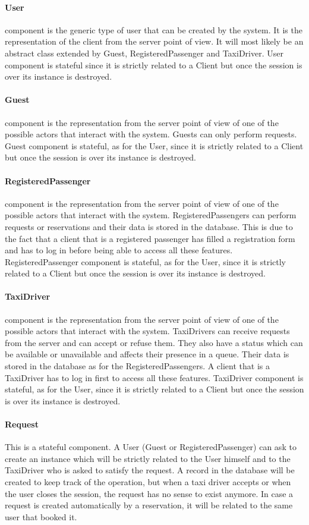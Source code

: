 		\paragraph{User} component is the generic type of user that can be created by the system. It is the representation of the client from the server point of view. It will most likely be an abstract class extended by Guest, RegisteredPassenger and TaxiDriver. User component is stateful since it is strictly related to a Client but once the session is over its instance is destroyed.
		\paragraph{Guest} component is the representation from the server point of view of one of the possible actors that interact with the system. Guests can only perform requests. Guest component is stateful, as for the User, since it is strictly related to a Client but once the session is over its instance is destroyed.
		\paragraph{RegisteredPassenger} component is the representation from the server point of view of one of the possible actors that interact with the system. RegisteredPassengers can perform requests or reservations and their data is stored in the database. This is due to the fact that a client that is a registered passenger has filled a registration form and has to log in before being able to access all these features. RegisteredPassenger component is stateful, as for the User, since it is strictly related to a Client but once the session is over its instance is destroyed.
		\paragraph{TaxiDriver} component is the representation from the server point of view of one of the possible actors that interact with the system. TaxiDrivers can receive requests from the server and can accept or refuse them. They also have a status which can be available or unavailable and affects their presence in a queue. Their data is stored in the database as for the RegisteredPassengers. A client that is a TaxiDriver has to log in first to access all these features. TaxiDriver component is stateful, as for the User, since it is strictly related to a Client but once the session is over its instance is destroyed.
		\paragraph{Request}
		This is a stateful component. A User (Guest or RegisteredPassenger) can ask to create an instance
		which will be strictly related to the User himself and to the TaxiDriver who is asked to satisfy the
		request. A record in the database will be created to keep track of the operation, but when a taxi
		driver accepts or when the user closes the session, the request has no sense to exist anymore.
		In case a request is created automatically by a reservation, it will be related to the same user that booked it.
